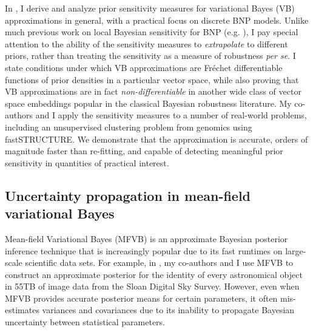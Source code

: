 In \citet{giordano:2021:bnpsensitivity}, I derive and analyze prior sensitivity
measures for variational Bayes (VB) approximations in general, with a practical
focus on discrete BNP models. Unlike much previous work on local Bayesian
sensitivity for BNP (e.g. \citet{Basu:2000:BNP_robustness}), I pay special
attention to the ability of the sensitivity measures to \emph{extrapolate} to
different priors, rather than treating the sensitivity as a measure of
robustness \textit{per se}.  I state conditions under which VB approximations
are Fr{\'e}chet differentiable functions of prior densities in a particular
vector space, while also proving that VB approximations are in fact
\emph{non-differentiable} in another wide class of vector space embeddings
popular in the classical Bayesian robustness literature.
My co-authors and I apply the sensitivity measures to a number of real-world
problems, including an unsupervised clustering problem from genomics using
fastSTRUCTURE.  We demonstrate that the approximation is accurate, orders of
magnitude faster than re-fitting, and capable of detecting meaningful prior
sensitivity in quantities of practical interest.


\subsection{Uncertainty propagation in mean-field variational Bayes}
%
Mean-field Variational Bayes (MFVB) is an approximate Bayesian posterior
inference technique that is increasingly popular due to its fast runtimes on
large-scale scientific data sets. For example, in
\citet{regier:2019:cataloging}, my co-authors and I use MFVB to construct an
approximate posterior for the identity of every astronomical object in 55TB
of image data from the Sloan Digital Sky Survey.  However, even when MFVB provides
accurate posterior means for certain parameters, it often mis-estimates
variances and covariances due to its inability to propagate Bayesian uncertainty
between statistical parameters.

